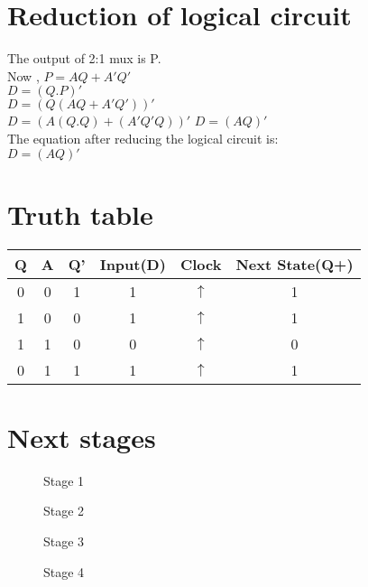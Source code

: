 \documentclass{article}
\begin{document}
\section{Reduction of logical circuit}
The output of 2:1 mux is P.\\
Now , $P=AQ+A'Q'$\\
$D=(Q.P)'$\\
$D=(Q(AQ+A'Q'))'$\\
 $D=(A(Q.Q)+(A'Q'Q))'$
 $D=(AQ)'$\\
 The equation after reducing the logical circuit is:\\
 $D=(AQ)'$\\

 \section{Truth table}
 \begin{table}[h]
  \centering
   \begin{tabular}{|c|c|c|c|c|c|}
   \hline
   Q & A & Q' & Input(D) & Clock & Next State(Q+)\\
   \hline
   0 & 0 & 1 & 1 & $\uparrow$ & 1\\
   \hline
   1 & 0 & 0 & 1 & $\uparrow$ & 1\\
   \hline
   1 & 1 & 0 & 0 & $\uparrow$ & 0\\
   \hline
   0 & 1 & 1 & 1 & $\uparrow$ & 1\\
   \hline
   \end{tabular}
   \end{table}
\section{Next stages}
\begin{figure}[h]
	\centering
	
	\caption{Stage 1}
\end{figure}
\pagebreak
\begin{figure}[h]
        \centering                                  
        \caption{Stage 2}
\end{figure}
\begin{figure}[h]
        \centering
	
	\caption{Stage 3}
\end{figure}
\pagebreak
\begin{figure}[h]
        \centering                                  
        \caption{Stage 4}
\end{figure} 
\end{document}
